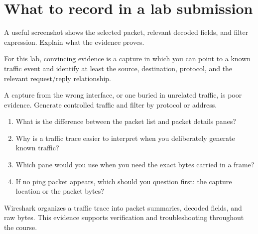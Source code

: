 \section{What to record in a lab submission}
A useful screenshot shows the selected packet, relevant decoded fields, and filter expression. Explain what the evidence proves.

\begin{verifybox}
For this lab, convincing evidence is a capture in which you can point to a known traffic event and identify at least the source, destination, protocol, and the relevant request/reply relationship.
\end{verifybox}

\begin{pitfall}
A capture from the wrong interface, or one buried in unrelated traffic, is poor evidence. Generate controlled traffic and filter by protocol or address.
\end{pitfall}

\begin{quickcheck}
\begin{enumerate}
\item What is the difference between the packet list and packet details panes?
\item Why is a traffic trace easier to interpret when you deliberately generate known traffic?
\item Which pane would you use when you need the exact bytes carried in a frame?
\item If no ping packet appears, which should you question first: the capture location or the packet bytes?
\end{enumerate}
\end{quickcheck}

\begin{chapterrecap}
Wireshark organizes a traffic trace into packet summaries, decoded fields, and raw bytes. This evidence supports verification and troubleshooting throughout the course.
\end{chapterrecap}


